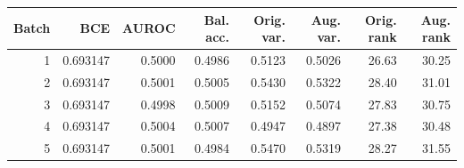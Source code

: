\begingroup\color{revisionblue}
\sffamily\fontsize{9}{11}\selectfont\renewcommand{\arraystretch}{1.08}\setlength{\tabcolsep}{3pt}
\begin{tabular}{rrrrrrrr}

\toprule
Batch & BCE & AUROC & Bal. acc. & Orig. var. & Aug. var. & Orig. rank & Aug. rank \\
\midrule

1 & 0.693147 & 0.5000 & 0.4986 & 0.5123 & 0.5026 & 26.63 & 30.25 \\

2 & 0.693147 & 0.5001 & 0.5005 & 0.5430 & 0.5322 & 28.40 & 31.01 \\

3 & 0.693147 & 0.4998 & 0.5009 & 0.5152 & 0.5074 & 27.83 & 30.75 \\

4 & 0.693147 & 0.5004 & 0.5007 & 0.4947 & 0.4897 & 27.38 & 30.48 \\

5 & 0.693147 & 0.5001 & 0.4984 & 0.5470 & 0.5319 & 28.27 & 31.55 \\

\bottomrule
\end{tabular}
\endgroup

